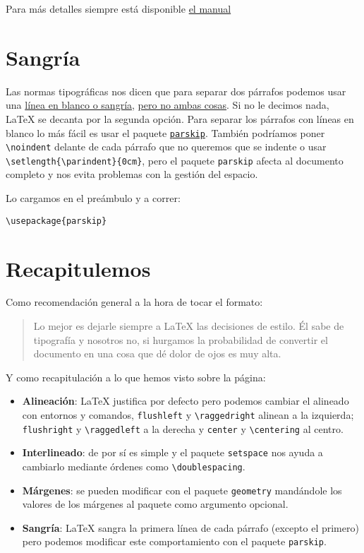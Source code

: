 Para más detalles siempre está disponible
\href{http://osl.ugr.es/CTAN/macros/latex/contrib/geometry/geometry.pdf}{el
manual}

\section{Sangría}\label{sec:sangria}

Las normas tipográficas nos dicen que para separar dos párrafos podemos
usar una
\href{http://practicaltypography.com/first-line-indents.html}{línea en
blanco o sangría},
\href{https://www.youtube.com/watch?v=LbDMJ5YMaxM}{pero no ambas cosas}.
Si no le decimos nada, LaTeX se decanta por la segunda opción. Para
separar los párrafos con líneas en blanco lo más fácil es usar el
paquete \href{http://ctan.org/pkg/parskip}{\lstinline!parskip!}. También
podríamos poner \lstinline!\noindent! delante de cada párrafo que no
queremos que se indente o usar \lstinline!\setlength{\parindent}{0cm}!,
pero el paquete \lstinline!parskip! afecta al documento completo y nos
evita problemas con la gestión del espacio.

Lo cargamos en el preámbulo y a correr:

\begin{lstlisting}[language={[latex]tex}]
\usepackage{parskip}
\end{lstlisting}

\section{Recapitulemos}\label{sec:recapitulemos}

Como recomendación general a la hora de tocar el formato:

\begin{quote}
Lo mejor es dejarle siempre a LaTeX las decisiones de estilo. Él sabe de
tipografía y nosotros no, si hurgamos la probabilidad de convertir el
documento en una cosa que dé dolor de ojos es muy alta.
\end{quote}

Y como recapitulación a lo que hemos visto sobre la página:

\begin{itemize}
\item
  \textbf{Alineación}: LaTeX justifica por defecto pero podemos cambiar
  el alineado con entornos y comandos, \lstinline!flushleft! y
  \lstinline!\raggedright! alinean a la izquierda;
  \lstinline!flushright! y \lstinline!\raggedleft! a la derecha y
  \lstinline!center! y \lstinline!\centering! al centro.
\item
  \textbf{Interlineado}: de por sí es simple y el paquete
  \lstinline!setspace! nos ayuda a cambiarlo mediante órdenes como
  \lstinline!\doublespacing!.
\item
  \textbf{Márgenes}: se pueden modificar con el paquete
  \lstinline!geometry! mandándole los valores de los márgenes al paquete
  como argumento opcional.
\item
  \textbf{Sangría}: LaTeX sangra la primera línea de cada párrafo
  (excepto el primero) pero podemos modificar este comportamiento con el
  paquete \lstinline!parskip!.
\end{itemize}

